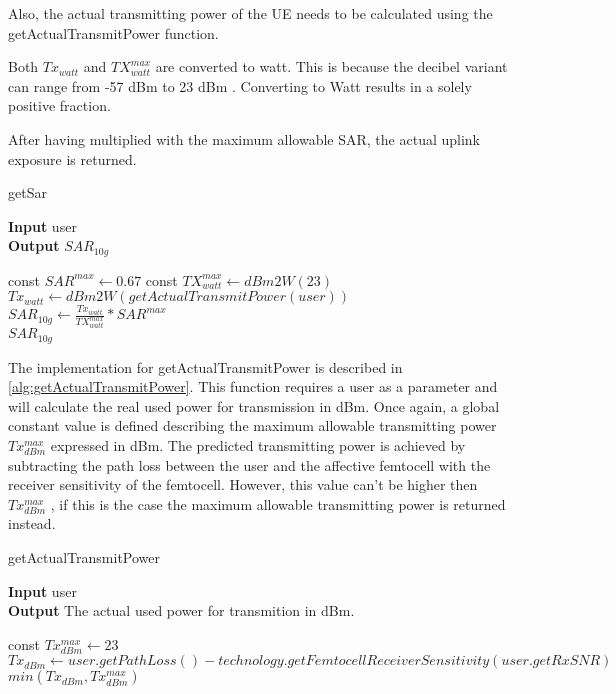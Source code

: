 Also, the actual transmitting power of the \gls{UE} needs to be calculated using the getActualTransmitPower function. 

Both $Tx_{watt}$ and $TX^{max}_{watt}$ are converted to watt. This is because the decibel variant can range from -57 dBm to 23 dBm \cite{J10_RDPgit}. Converting to Watt results in a solely positive fraction. 

After having multiplied with the maximum allowable \gls{SAR}, the actual uplink exposure is returned.

\begin{algorithm}
	\caption{getSar} 
	\label{alg:getsar}
     \hspace*{\algorithmicindent} \textbf{Input} user \\
     \hspace*{\algorithmicindent} \textbf{Output} $SAR_{10g}$
	\begin{algorithmic}[1]
		\State  const $SAR^{max} \gets 0.67$
		\State  const $TX^{max}_{watt} \gets dBm2W(23)$
		\vspace{4 mm}
		\State $Tx_{watt} \gets dBm2W(getActualTransmitPower(user)) $		
		\State $ SAR_{10g} \gets \frac{Tx_{watt}}{TX^{max}_{watt}} * SAR^{max}$ \\
		\Return $ SAR_{10g}$
	\end{algorithmic} 
\end{algorithm}


The implementation for getActualTransmitPower is described in \ref{alg:getActualTransmitPower}. This function requires a user as a parameter and will calculate the real used power for transmission in dBm.
Once again, a global constant value is defined describing the maximum allowable transmitting power $Tx^{max}_{dBm}$ expressed in dBm. The predicted transmitting power is achieved by subtracting the path loss between the user and the affective femtocell with the receiver sensitivity of the femtocell. However, this value can't be higher then  $Tx^{max}_{dBm}$ , if this is the case the maximum allowable transmitting power is returned instead.

\begin{algorithm}
	\caption{getActualTransmitPower} 
	\label{alg:getActualTransmitPowergit}
     \hspace*{\algorithmicindent} \textbf{Input} user \\
     \hspace*{\algorithmicindent} \textbf{Output} The actual used power for transmition in dBm.
	\begin{algorithmic}[1]
		\State const $Tx^{max}_{dBm} \gets 23$
		\vspace{4 mm}
		\State $ Tx_{dBm} \gets user.getPathLoss() - technology.getFemtocellReceiverSensitivity(user.getRxSNR)$ \\
		\Return $min(Tx_{dBm}, Tx^{max}_{dBm})$ 
	\end{algorithmic} 
\end{algorithm}


